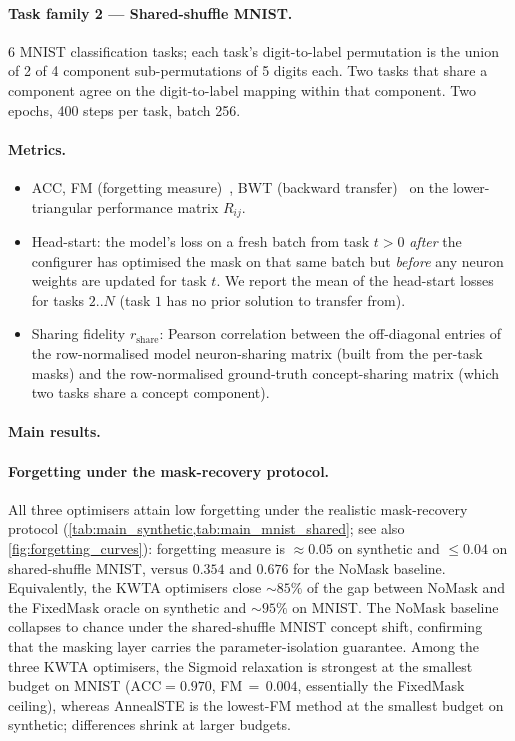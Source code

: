 \documentclass{article}
\theoremstyle{plain}
\theoremstyle{remark}
\begin{document}
\paragraph{Task family 2 — Shared-shuffle MNIST.}
6 MNIST classification tasks; each task's digit-to-label permutation
is the union of 2 of 4 component sub-permutations of 5 digits each.
Two tasks that share a component agree on the digit-to-label mapping
within that component.  Two epochs, 400 steps per task, batch 256.

\paragraph{Metrics.}
\begin{itemize}
\item ACC, FM (forgetting measure)~\citep{chaudhry2018efficient}, BWT
(backward transfer)~\citep{lopez2017gradient} on the lower-triangular
performance matrix $R_{ij}$.
\item Head-start: the model's loss on a fresh batch from task $t>0$
\emph{after} the configurer has optimised the mask on that same batch
but \emph{before} any neuron weights are updated for task $t$. We
report the mean of the head-start losses for tasks $2..N$ (task $1$
has no prior solution to transfer from).
\item Sharing fidelity $r_\mathrm{share}$: Pearson correlation between
the off-diagonal entries of the row-normalised model neuron-sharing
matrix (built from the per-task masks) and the row-normalised
ground-truth concept-sharing matrix (which two tasks share a concept
component).
\end{itemize}

\paragraph{Main results.}



\paragraph{Forgetting under the mask-recovery protocol.}
All three optimisers attain low forgetting under the realistic
mask-recovery protocol (\cref{tab:main_synthetic,tab:main_mnist_shared};
see also \cref{fig:forgetting_curves}): forgetting measure is
$\approx\!0.05$ on synthetic and $\le\!0.04$ on shared-shuffle MNIST,
versus $0.354$ and $0.676$ for the NoMask baseline. Equivalently, the
KWTA optimisers close $\sim\!85\%$ of the gap between NoMask and the
FixedMask oracle on synthetic and $\sim\!95\%$ on MNIST. The NoMask
baseline collapses to chance under the shared-shuffle MNIST concept
shift, confirming that the masking layer carries the
parameter-isolation guarantee. Among the three KWTA optimisers, the
Sigmoid relaxation is strongest at the smallest budget on MNIST
($\mathrm{ACC}{=}0.970$, FM$\,{=}\,0.004$, essentially the FixedMask
ceiling), whereas AnnealSTE is the lowest-FM method at the smallest
budget on synthetic; differences shrink at larger budgets.
\end{document}
